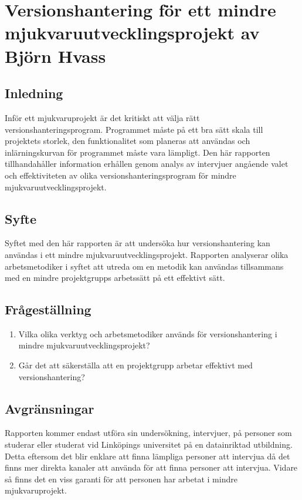 \chapter{Versionshantering för ett mindre mjukvaruutvecklingsprojekt av Björn Hvass}


%
%
%
%
%
%
%
%
%
%
%

\vspace{3em}
\section{Inledning}
Inför ett mjukvaruprojekt är det kritiskt att välja rätt versionshanteringsprogram. Programmet måste på ett bra sätt skala till projektets storlek, den funktionalitet som planeras att användas och inlärningskurvan för programmet måste vara lämpligt. Den här rapporten tillhandahåller information erhållen genom analys av intervjuer angående valet och effektiviteten av olika versionshanteringsprogram för mindre mjukvaruutvecklingsprojekt.

\section{Syfte}
Syftet med den här rapporten är att undersöka hur versionshantering kan användas i ett mindre mjukvaruutvecklingsprojekt. Rapporten analyserar olika arbetsmetodiker i syftet att utreda om en metodik kan användas tillsammans med en mindre projektgrupps arbetssätt på ett effektivt sätt.

\section{Frågeställning}
\begin{enumerate}
    \item Vilka olika verktyg och arbetsmetodiker används för versionshantering i mindre mjukvaruutvecklingsprojekt?
    \item Går det att säkerställa att en projektgrupp arbetar effektivt med versionshantering?
\end{enumerate}

\section{Avgränsningar}
Rapporten kommer endast utföra sin undersökning, intervjuer, på personer som studerar eller studerat vid Linköpings universitet på en datainriktad utbildning. Detta eftersom det blir enklare att finna lämpliga personer att intervjua då det finns mer direkta kanaler att använda för att finna personer att intervjua. Vidare så finns det en viss garanti för att personen har arbetat i mindre mjukvaruprojekt.

